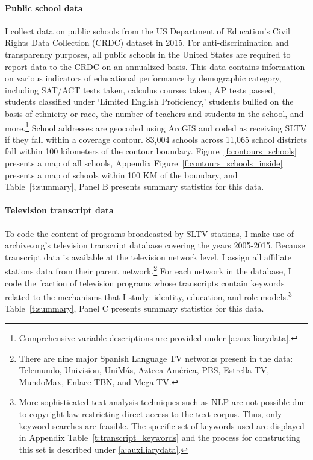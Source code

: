 \documentclass[11pt]{article}
\begin{document}
\paragraph{Public school data} I collect data on public schools from the US Department of Education's Civil Rights Data Collection (CRDC) dataset in 2015. For anti-discrimination and transparency purposes, all public schools in the United States are required to report data to the CRDC on an annualized basis. This data contains information on various indicators of educational performance by demographic category, including SAT/ACT tests taken, calculus courses taken, AP tests passed, students classified under `Limited English Proficiency,' students bullied on the basis of ethnicity or race, the number of teachers and students in the school, and more.\footnote{ Comprehensive variable descriptions are provided under \ref{a:auxiliarydata}.} School addresses are geocoded using ArcGIS and coded as receiving SLTV if they fall within a coverage contour. 83,004 schools across 11,065 school districts fall within 100 kilometers of the contour boundary. Figure~\ref{f:contours_schools} presents a map of all schools, Appendix Figure~\ref{f:contours_schools_inside} presents a map of schools within 100 KM of the boundary, and Table~\ref{t:summary}, Panel B presents summary statistics for this data. 


\paragraph{Television transcript data} To code the content of programs broadcasted by SLTV stations, I make use of archive.org's television transcript database covering the years 2005-2015. Because transcript data is available at the television network level, I assign all affiliate stations data from their parent network.\footnote{ There are nine major Spanish Language TV networks present in the data: Telemundo, Univision, UniMás, Azteca América, PBS, Estrella TV, MundoMax, Enlace TBN, and Mega TV. } For each network in the database, I code the fraction of television programs whose transcripts contain keywords related to the mechanisms that I study: identity, education, and role models.\footnote{ More sophisticated text analysis techniques such as NLP are not possible due to copyright law restricting direct access to the text corpus. Thus, only keyword searches are feasible. The specific set of keywords used are displayed in Appendix Table~\ref{t:transcript_keywords} and the process for constructing this set is described under \ref{a:auxiliarydata}.}  Table~\ref{t:summary}, Panel C presents summary statistics for this data. 
\end{document}
